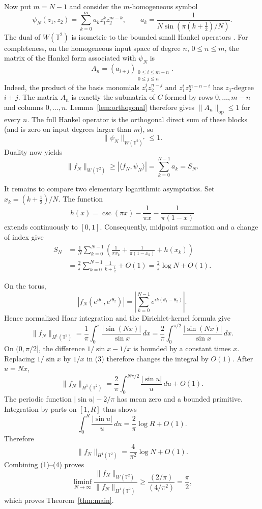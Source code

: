 \documentclass[11pt]{article}
\newcommand{\T}{\mathbb T}
\begin{document}
Now put $m=N-1$ and consider the $m$-homogeneous symbol
\[
 \psi_N(z_1,z_2)=\sum_{k=0}^{m}a_kz_1^kz_2^{m-k},
 \qquad
 a_k=\frac{1}{N\sin\!\left(\pi(k+\tfrac12)/N\right)}.
\]
The dual of $W(\T^2)$ is isometric to the bounded small Hankel operators
\cite{BB}.  For completeness, on the homogeneous input space of degree $n$,
$0\leq n\leq m$, the matrix of the Hankel form associated with $\psi_N$ is
\[
 A_n=(a_{i+j})_{\substack{0\leq i\leq m-n\\0\leq j\leq n}}.
\]
Indeed, the product of the basis monomials
$z_1^jz_2^{n-j}$ and $z_1^iz_2^{m-n-i}$ has $z_1$-degree $i+j$.
The matrix $A_n$ is exactly the submatrix of $C$ formed by rows
$0,\ldots,m-n$ and columns $0,\ldots,n$.  Lemma~\ref{lem:orthogonal} therefore
gives $\|A_n\|_{\mathrm{op}}\leq1$ for every $n$.  The full Hankel operator is
the orthogonal direct sum of these blocks (and is zero on input degrees larger
than $m$), so
\[
 \|\psi_N\|_{W(\T^2)^*}\leq1.
\]
Duality now yields
\[
 \|f_N\|_{W(\T^2)}
 \geq |\langle f_N,\psi_N\rangle|
 =\sum_{k=0}^{N-1}a_k=S_N.                                      \tag{1}
\]

It remains to compare two elementary logarithmic asymptotics.  Set
$x_k=(k+\tfrac12)/N$.  The function
\[
 h(x)=\csc(\pi x)-\frac1{\pi x}-\frac1{\pi(1-x)}
\]
extends continuously to $[0,1]$.  Consequently, midpoint summation and a
change of index give
\begin{align*}
 S_N
 &=\frac1N\sum_{k=0}^{N-1}
 \left(\frac1{\pi x_k}+\frac1{\pi(1-x_k)}+h(x_k)\right)\\
 &=\frac2\pi\sum_{k=0}^{N-1}\frac1{k+\tfrac12}+O(1)
 =\frac2\pi\log N+O(1).                                      \tag{2}
\end{align*}

On the torus,
\[
 |f_N(e^{i\theta_1},e^{i\theta_2})|
 =\left|\sum_{k=0}^{N-1}e^{ik(\theta_1-\theta_2)}\right|.
\]
Hence normalized Haar integration and the Dirichlet-kernel formula give
\[
 \|f_N\|_{H^1(\T^2)}
 =\frac1\pi\int_0^\pi\frac{|\sin(Nx)|}{\sin x}\,dx
 =\frac2\pi\int_0^{\pi/2}\frac{|\sin(Nx)|}{\sin x}\,dx.       \tag{3}
\]
On $(0,\pi/2]$, the difference $1/\sin x-1/x$ is bounded by a constant
times $x$.  Replacing $1/\sin x$ by $1/x$ in (3) therefore changes the
integral by $O(1)$.  After $u=Nx$,
\[
 \|f_N\|_{H^1(\T^2)}
 =\frac2\pi\int_0^{N\pi/2}\frac{|\sin u|}{u}\,du+O(1).
\]
The periodic function $|\sin u|-2/\pi$ has mean zero and a bounded
primitive.  Integration by parts on $[1,R]$ thus shows
\[
 \int_0^R\frac{|\sin u|}{u}\,du=\frac2\pi\log R+O(1).
\]
Therefore
\[
 \|f_N\|_{H^1(\T^2)}=\frac4{\pi^2}\log N+O(1).                 \tag{4}
\]
Combining (1)--(4) proves
\[
 \liminf_{N\to\infty}
 \frac{\|f_N\|_{W(\T^2)}}{\|f_N\|_{H^1(\T^2)}}
 \geq\frac{(2/\pi)}{(4/\pi^2)}=\frac\pi2,
\]
which proves Theorem~\ref{thm:main}.
\end{document}
